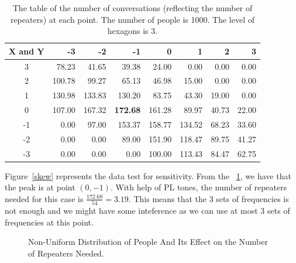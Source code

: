 \documentclass{icmmcm}
\begin{document}
\begin{table}[htbp]
  \begin{center}
    \begin{tabular}{@{}c|rrrrrrr@{}} \toprule
X and Y  	&-3 	&-2 		&-1		&0		&1		&2		&3\\ \midrule    
3&78.23	&41.65	&39.38	&24.00	&0.00	&0.00	&0.00 \\
2&100.78	&99.27	&65.13	&46.98	&15.00	&0.00	&0.00	\\
1&130.98	&133.83	&130.20	&83.75	&43.30	&19.00	&0.00	\\
0&107.00	&167.32	&\textbf{172.68}	&161.28	&89.97	&40.73	&22.00	\\
-1&0.00	&97.00	&153.37	&158.77	&134.52	&68.23	&33.60	\\
-2&0.00	&0.00	&89.00	&151.90	&118.47	&89.75	&41.27	\\
-3&0.00	&0.00	&0.00	&100.00	&113.43	&84.47	&62.75	\\

 \bottomrule	
    \end{tabular}
  \end{center}
  \caption[A Distribution of Repeaters for a Non-Uniform Distribution of People]{The table of the number of conversations (reflecting the number of repeaters) at each point. The number of people is 1000. The level of hexagons is 3.}
  \label{tab:non-uniform}
\end{table}

Figure~\ref{skew} represents the data test for sensitivity. From the ~\ref{tab:non-uniform}, we have that the peak is at point $(0,-1)$. With help of PL tones, the number of repeaters needed for this case is $\frac{172.68}{54}=3.19.$ This means that the 3 sets of frequencies is not enough and we might have some inteference as we can use at most 3 sets of frequencies at this point.
\begin{figure}[ht]
\begin{center}
\end{center}
\caption[A Distribution of Repeaters for a Non-Uniform Distribution of People]{Non-Uniform Distribution of People And Its Effect on the Number of Repeaters Needed.\label{skew}}%
\label{fig:skew}
\end{figure}
\end{document}
